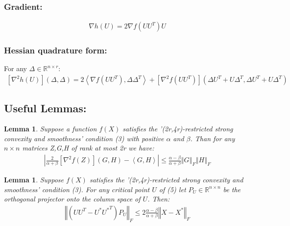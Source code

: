 \documentclass{article}
\newtheorem{lemma}[theorem]{Lemma}
\begin{document}
\subsubsection{Gradient:}
\begin{align*}
    \nabla h\left(U\right)=2\nabla f\left(UU^T\right)U
\end{align*}

\subsubsection{Hessian quadrature form:}
For any $\Delta\in \mathbb{R}^{n\times r}$:
\begin{align*}
    \left[\nabla^2h\left(U\right)\right]\left(\Delta,\Delta\right)=2\left<\nabla f\left(UU^T\right),\Delta\Delta^T\right> + \left[\nabla^2 f\left(UU^T\right)\right]\left(\Delta U^T+U\Delta^T,\Delta U^T+U\Delta^T\right)
\end{align*}

\subsection{Useful Lemmas:}
\begin{lemma} \label{leamma_1}
Suppose a function $f\left(X\right)$ satisfies the '(2r,4r)-restricted strong convexity and smoothness' condition (3) with positive $\alpha$ and $\beta$. Than for any $n\times n$ matrices Z,G,H of rank at most 2r we have:
\begin{align*}
    \left\vert\frac{2}{\alpha + \beta}\left[\nabla^2 f\left(Z\right)\right]\left(G,H\right)-\left<G,H\right>\right\vert\le \frac{\alpha - \beta}{\alpha + \beta}\left\Vert G\right\Vert_F\left\Vert H\right\Vert_F
\end{align*}
\end{lemma}

\begin{lemma} \label{lemma_2}
Suppose $f\left(X\right)$ satisfies the '(2r,4r)-restricted strong convexity and smoothness' condition (3). For any critical point $U$ of (5) let $P_U\in\mathbb{R}^{n\times n}$ be the orthogonal projector onto the column space of $U$. Then:
\begin{align*}
    \left\Vert \left(UU^T-U^*{U^*}^T\right)P_U\right\Vert_F\le2\frac{\alpha - \beta}{\alpha + \beta}\left\Vert X-X^*\right\Vert_F
\end{align*}
\end{lemma}
\end{document}
